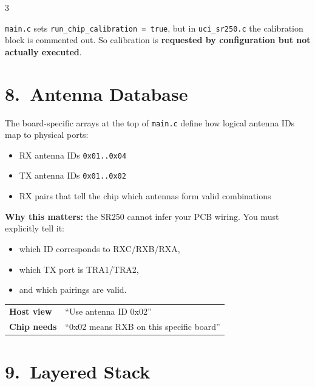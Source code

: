\documentclass[10pt]{article}
\begin{document}
\begin{multicols*}{3}
\begin{tcolorbox}[warnbox={Important Mismatch}]
\texttt{main.c} sets \texttt{run\_chip\_calibration = true}, but in \texttt{uci\_sr250.c} the calibration block is commented out.
So calibration is \textbf{requested by configuration but not actually executed}.
\end{tcolorbox}

\section*{8.\ Antenna Database}

The board-specific arrays at the top of \texttt{main.c} define how logical antenna IDs map to physical ports:
\begin{itemize}
  \item RX antenna IDs \texttt{0x01..0x04}
  \item TX antenna IDs \texttt{0x01..0x02}
  \item RX pairs that tell the chip which antennas form valid combinations
\end{itemize}

\textbf{Why this matters:}
the SR250 cannot infer your PCB wiring. You must explicitly tell it:
\begin{itemize}
  \item which ID corresponds to RXC/RXB/RXA,
  \item which TX port is TRA1/TRA2,
  \item and which pairings are valid.
\end{itemize}

\begin{tcolorbox}[newbox={Host View vs Chip View}]
\begin{tabular}{@{}p{2.6cm}p{4.7cm}@{}}
\textbf{Host view} & ``Use antenna ID 0x02'' \\
\textbf{Chip needs} & ``0x02 means RXB on this specific board'' \\
\end{tabular}
\end{tcolorbox}

\section*{9.\ Layered Stack}


\end{multicols*}
\end{document}
